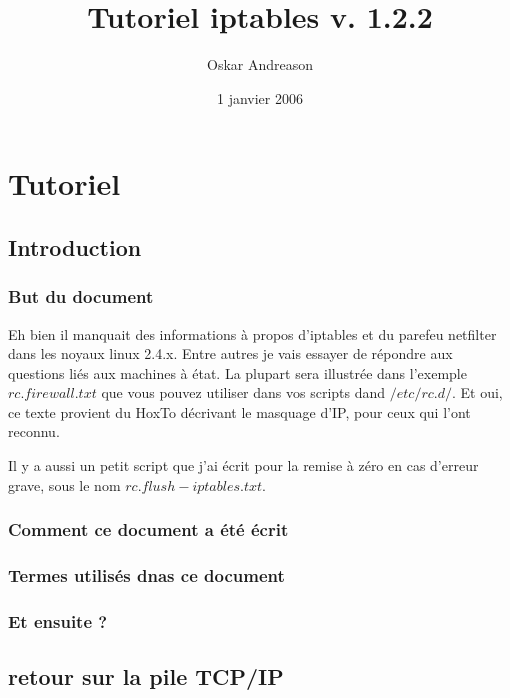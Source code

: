 \documentclass[a4paper,11pt]{report}
\title{Tutoriel iptables v. 1.2.2}
\author{Oskar Andreason}
\date{1 janvier 2006}
\begin{document}
\maketitle 

\tableofcontents 

\part{Tutoriel} %


\chapter{Introduction} %

\section{But du document} %
Eh bien il manquait des informations à propos d'iptables et du parefeu netfilter dans les noyaux linux 2.4.x. Entre autres je vais essayer de répondre aux questions liés aux machines à état. La plupart sera illustrée dans l'exemple $ rc.firewall.txt $ que vous pouvez utiliser dans vos scripts dand $ /etc/rc.d/ $. Et oui, ce texte provient du HoxTo décrivant le masquage d'IP, pour ceux qui l'ont reconnu.

Il y a aussi un petit script que j'ai écrit pour la remise à zéro en cas d'erreur grave, sous le nom $rc.flush-iptables.txt $.

\section{Comment ce document a été écrit} %

\section{Termes utilisés dnas ce document} %

\section{Et ensuite ?} %


\chapter{retour sur la pile TCP/IP} %
\end{document}
